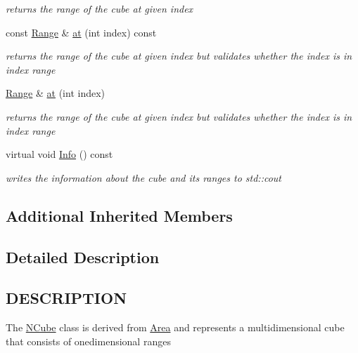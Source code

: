\begin{DoxyCompactItemize}
\begin{DoxyCompactList}\small\item\em returns the range of the cube at given index \end{DoxyCompactList}\item 
\mbox{\label{class_n_cube_a6e89fbd9fc41e833db790b6969b05e0e}} 
const \hyperlink{class_range}{Range} \& \hyperlink{class_n_cube_a6e89fbd9fc41e833db790b6969b05e0e}{at} (int index) const
\begin{DoxyCompactList}\small\item\em returns the range of the cube at given index but validates whether the index is in index range \end{DoxyCompactList}\item 
\mbox{\label{class_n_cube_a4b10f642983c3c2d32f7b9c4ab5117a0}} 
\hyperlink{class_range}{Range} \& \hyperlink{class_n_cube_a4b10f642983c3c2d32f7b9c4ab5117a0}{at} (int index)
\begin{DoxyCompactList}\small\item\em returns the range of the cube at given index but validates whether the index is in index range \end{DoxyCompactList}\item 
\mbox{\label{class_n_cube_aa7387e8654574bf3f4a0e32633516451}} 
virtual void \hyperlink{class_n_cube_aa7387e8654574bf3f4a0e32633516451}{Info} () const
\begin{DoxyCompactList}\small\item\em writes the information about the cube and its ranges to std\+::cout \end{DoxyCompactList}\end{DoxyCompactItemize}
\subsection*{Additional Inherited Members}


\subsection{Detailed Description}
\hypertarget{function_8h_DESCRIPTION}{}\subsection{D\+E\+S\+C\+R\+I\+P\+T\+I\+ON}\label{function_8h_DESCRIPTION}
The \hyperlink{class_n_cube}{N\+Cube} class is derived from \hyperlink{class_area}{Area} and represents a multidimensional cube that consists of onedimensional ranges 

